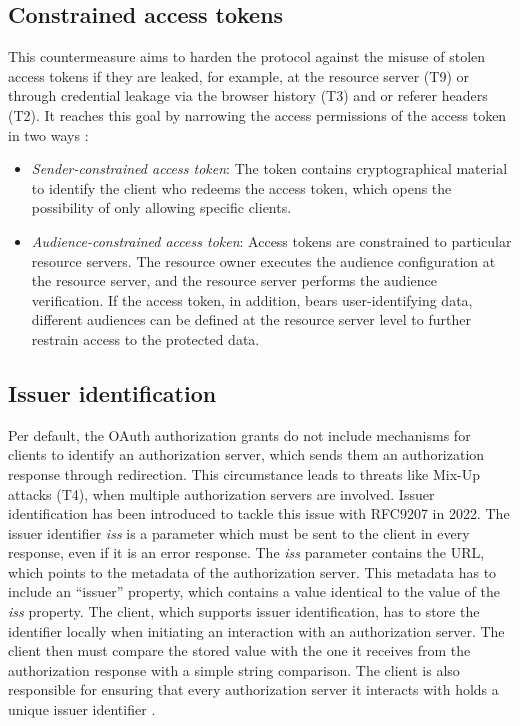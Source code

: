\documentclass[
    fontsize=12pt,
    headings=small,
    parskip=half,           %
    bibliography=totoc,
    numbers=noenddot,       %
    open=any,               %
    ]{scrreprt}
\begin{document}
\subsection{Constrained access tokens}
This countermeasure aims to harden the protocol against the misuse of stolen access tokens if they are leaked, for example, at the resource server (T9) or through credential leakage via the browser history (T3) and or referer headers (T2). It reaches this goal by narrowing the access permissions of the access token in two ways \cite{lodderstedt2020oauth}:
\begin{itemize}
	\item \emph{Sender-constrained access token}: The token contains cryptographical material to identify the client who redeems the access token, which opens the possibility of only allowing specific clients.
	\item \emph{Audience-constrained access token}: Access tokens are constrained to particular resource servers. The resource owner executes the audience configuration at the resource server, and the resource server performs the audience verification. If the access token, in addition, bears user-identifying data, different audiences can be defined at the resource server level to further restrain access to the protected data.
\end{itemize}

 
\subsection{Issuer identification}
Per default, the OAuth authorization grants do not include mechanisms for clients to identify an authorization server, which sends them an authorization response through redirection. This circumstance leads to threats like Mix-Up attacks (T4), when multiple authorization servers are involved. Issuer identification has been introduced to tackle this issue with RFC9207 in 2022. The issuer identifier \emph {iss} is a parameter which must be sent to the client in every response, even if it is an error response. The \emph{iss} parameter contains the URL, which points to the metadata of the authorization server. This metadata has to include an ``issuer'' property, which contains a value identical to the value of the \emph{iss} property. The client, which supports issuer identification, has to store the identifier locally when initiating an interaction with an authorization server. The client then must compare the stored value with the one it receives from the authorization response with a simple string comparison. The client is also responsible for ensuring that every authorization server it interacts with holds a unique issuer identifier \cite{meyer2022rfc}.
\end{document}
